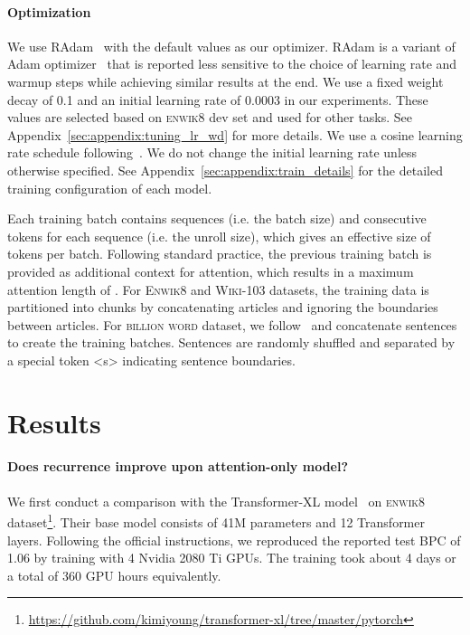 \paragraph{Optimization}
We use RAdam~\cite{liu2019radam} with the default  values as our optimizer.
RAdam is a variant of Adam optimizer~\cite{Kingma:14adam} that is reported less sensitive to the choice of learning rate and warmup steps while achieving similar results at the end.
We use a fixed weight decay of 0.1 and an initial learning rate of 0.0003 in our experiments.
These values are selected based on \textsc{enwik8} dev set and used for other tasks.
See Appendix~\ref{sec:appendix:tuning_lr_wd} for more details.
We use a cosine learning rate schedule following~\citet{dai-etal-2019-transformer}.
We do not change the initial learning rate unless otherwise specified.
See Appendix~\ref{sec:appendix:train_details} for the detailed training configuration of each model.

Each training batch contains  sequences (i.e. the batch size) and  consecutive tokens for each sequence (i.e. the unroll size), which gives an effective size of  tokens per batch.
Following standard practice, the previous training batch is provided as additional context for attention, which results in a maximum attention length of .
For \textsc{Enwik8} and \textsc{Wiki-103} datasets, the training data is partitioned into  chunks by concatenating articles and ignoring the boundaries between articles.
For \textsc{billion word} dataset, we follow~\citet{dai-etal-2019-transformer} and concatenate sentences to create the training batches.
Sentences are randomly shuffled and separated by a special token <s> indicating sentence boundaries.

\section{Results}
\label{sec:results}

\paragraph{Does recurrence improve upon attention-only model?}
We first conduct a comparison with the Transformer-XL model~\cite{dai-etal-2019-transformer} on \textsc{enwik8} dataset\footnote{\url{https://github.com/kimiyoung/transformer-xl/tree/master/pytorch}}.
Their base model consists of 41M parameters and 12 Transformer layers.
Following the official instructions, we reproduced the reported test BPC of 1.06 by training with 4 Nvidia 2080 Ti GPUs.
The training took about 4 days or a total of 360 GPU hours equivalently.

